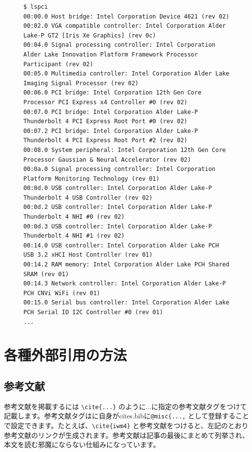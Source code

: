 \begin{figure}[tb]
  \begin{lstlisting}[caption={2段組ぶち抜きでコードブロックを掲載する例},label={sample-codeblock},captionpos=b,basicstyle=\ttfamily\textsf\tiny\fontsize{6.3pt}{6.3pt}\selectfont]
$ lspci
00:00.0 Host bridge: Intel Corporation Device 4621 (rev 02)
00:02.0 VGA compatible controller: Intel Corporation Alder Lake-P GT2 [Iris Xe Graphics] (rev 0c)
00:04.0 Signal processing controller: Intel Corporation Alder Lake Innovation Platform Framework Processor Participant (rev 02)
00:05.0 Multimedia controller: Intel Corporation Alder Lake Imaging Signal Processor (rev 02)
00:06.0 PCI bridge: Intel Corporation 12th Gen Core Processor PCI Express x4 Controller #0 (rev 02)
00:07.0 PCI bridge: Intel Corporation Alder Lake-P Thunderbolt 4 PCI Express Root Port #0 (rev 02)
00:07.2 PCI bridge: Intel Corporation Alder Lake-P Thunderbolt 4 PCI Express Root Port #2 (rev 02)
00:08.0 System peripheral: Intel Corporation 12th Gen Core Processor Gaussian & Neural Accelerator (rev 02)
00:0a.0 Signal processing controller: Intel Corporation Platform Monitoring Technology (rev 01)
00:0d.0 USB controller: Intel Corporation Alder Lake-P Thunderbolt 4 USB Controller (rev 02)
00:0d.2 USB controller: Intel Corporation Alder Lake-P Thunderbolt 4 NHI #0 (rev 02)
00:0d.3 USB controller: Intel Corporation Alder Lake-P Thunderbolt 4 NHI #1 (rev 02)
00:14.0 USB controller: Intel Corporation Alder Lake PCH USB 3.2 xHCI Host Controller (rev 01)
00:14.2 RAM memory: Intel Corporation Alder Lake PCH Shared SRAM (rev 01)
00:14.3 Network controller: Intel Corporation Alder Lake-P PCH CNVi WiFi (rev 01)
00:15.0 Serial bus controller: Intel Corporation Alder Lake PCH Serial IO I2C Controller #0 (rev 01)
...
  \end{lstlisting}
\end{figure}


\section{各種外部引用の方法}
\subsection{参考文献}
参考文献を掲載するには \verb=\cite{...}= のように...に指定の参考文献タグをつけて記載します。参考文献タグはに自身がcites.bibに\verb=@misc{...,= として登録することで設定できます。たとえば、\verb=\cite{iwm4}= と参考文献\cite{iwm4}をつけると、左記のとおり参考文献のリンクが生成されます。参考文献は記事の最後にまとめて列挙され、本文を読む邪魔にならない仕組みになっています。

